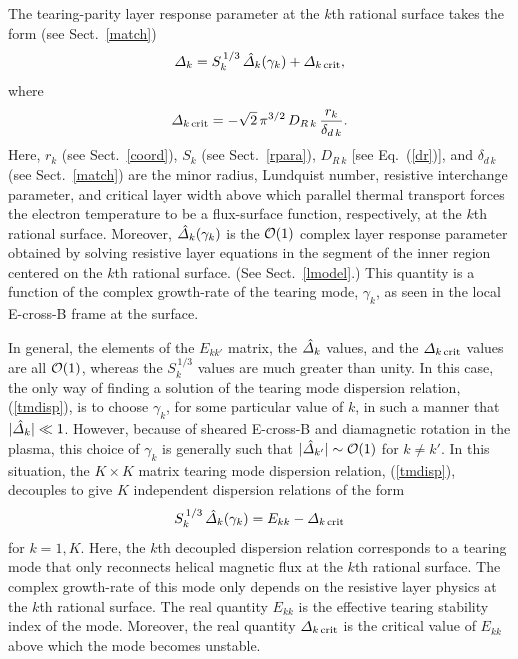 \documentclass[12pt,prb,aps]{revtex4-1}
\begin{document}
The tearing-parity layer response parameter at the $k$th rational surface takes the form (see Sect.~\ref{match})
\begin{equation}
{\mit\Delta}_k = S_k^{\,1/3}\,\hat{\mit\Delta}_k(\gamma_k) + {\mit\Delta}_{k\,{\rm crit}},
\end{equation}
where
\begin{equation}\label{dcrit}
{\mit\Delta}_{k\,{\rm crit}} =- \sqrt{2}\,\pi^{3/2}\,D_{R\,k}\,\frac{r_k}{\delta_{d\,k}}.
\end{equation}
Here, $r_k$ (see Sect.~\ref{coord}), $S_k$ (see Sect.~\ref{rpara}), $D_{R\,k}$ [see Eq.~(\ref{dr})], and $\delta_{d\,k}$ (see Sect.~\ref{match}) are the minor radius,  Lundquist number, resistive interchange parameter, and critical layer width above
which parallel thermal transport forces the electron temperature to be a flux-surface function, respectively, at the $k$th rational surface.  Moreover, $\hat{\mit\Delta}_k(\gamma_k)$ is
the ${\cal O}(1)$ complex layer response parameter obtained by solving  resistive layer equations in the segment of the inner region centered on the $k$th rational
surface. (See Sect.~\ref{lmodel}.) This quantity is a function of the complex growth-rate of the tearing mode, $\gamma_k$,  as seen in the local E-cross-B frame at the surface. 

In general, the elements of the $E_{kk'}$ matrix, the $\hat{\mit\Delta}_k$ values, and  the ${\mit\Delta}_{k\,{\rm crit}}$ values are all ${\cal O}(1)$, whereas the
$S_k^{\,1/3}$ values are much greater than unity. In this case, the only way of finding a solution of the tearing mode dispersion relation, (\ref{tmdisp}), is
to choose $\gamma_k$, for some particular value of $k$,  in such a manner that $|\hat{\mit\Delta}_k|\ll 1$. However, because of sheared E-cross-B and diamagnetic rotation in  the plasma, 
this choice of $\gamma_k$ is generally such that $|\hat{\mit\Delta}_{k'}|\sim{\cal O}(1)$ for $k\neq k'$.\cite{am1} In this situation, the $K\times K$ 
matrix tearing mode dispersion relation, (\ref{tmdisp}), decouples to give $K$ independent dispersion relations of the form\,\cite{am1}
\begin{equation}\label{decouple}
S_k^{\,1/3}\,\hat{\mit\Delta}_k(\gamma_k) = E_{kk}-{\mit\Delta}_{k\,{\rm crit}}
\end{equation}
for $k=1,K$. Here, the $k$th decoupled dispersion relation corresponds to a tearing mode that only reconnects helical magnetic flux at the
$k$th rational surface. The complex growth-rate of this mode only depends on the resistive layer physics at the $k$th rational surface. The
real quantity $E_{kk}$ is the effective tearing stability index of the mode.\cite{fkr} Moreover, the real quantity ${\mit\Delta}_{k\,{\rm crit}}$ is the critical
value of $E_{kk}$ above which the mode becomes unstable.  
\end{document}
